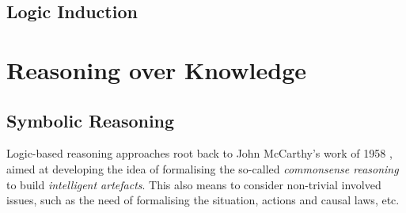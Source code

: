 \documentclass[12pt,a4paper,openright,twoside]{book}
\begin{document}




\section{Logic Induction}






\chapter{Reasoning over Knowledge}\label{chap:reasoning}

\section{Symbolic Reasoning}

Logic-based reasoning approaches root back to John McCarthy's work of 1958 \cite{Mccarthy1958}, aimed at developing the idea of formalising the so-called \emph{commonsense reasoning} to build \emph{intelligent artefacts}. 
%
This also means to consider non-trivial involved issues, such as the need of formalising the situation, actions and causal laws, etc.
%
\end{document}
